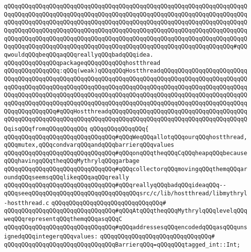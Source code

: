 \verb|qQQqqQQqqQQqqQQqqQQqqQQqqQQqqQQqqQQqqQQqqQQqqQQqqQQqqQQqqQQqqQQqqQQqqQQqqQQqqQQqqQQqqQQqqQQqqQQqqQQqqQQqqQQqqQQqqQQqqQQqqQQqqQQqqQQqqQQqqQQqqQQqqQQqqQQqqQQqqQQqqQQqqQQqqQQqqQQqqQQqqQQqqQQqqQQqqQQqqQQqqQQqqQQqqQQqqQQqqQQqqQQqqQQqqQQqqQQqqQQqqQQqqQQqqQQqqQQqqQQqqQQqqQQqqQQqqQQqqQQqqQQqqQQqqQQqqQQqqQQqqQQqqQQqqQQqqQQqqQQqqQQqqQQqqQQqqQQqqQQqqQQqqQQqqQQqqQQqqQQqqQQqqQQqqQQqqQQqqQQqqQQqqQQqqQQqqQQqqQQqqQQqqQQqqQQqqQQq#qQQqwouldqQQqbeqQQqaqQQqreallyqQQqbadqQQqidea.|\newline
\verb|qQQqqQQqqQQqqQQqpackageqQQqqQQqqQQqhostthread|\newline
\verb|qQQqqQQqqQQqqQQq:qQQq(weak)qQQqqQQqHostthreadqQQqqQQqqQQqqQQqqQQqqQQqqQQqqQQqqQQqqQQqqQQqqQQqqQQqqQQqqQQqqQQqqQQqqQQqqQQqqQQqqQQqqQQqqQQqqQQqqQQqqQQqqQQqqQQqqQQqqQQqqQQqqQQqqQQqqQQqqQQqqQQqqQQqqQQqqQQqqQQqqQQqqQQqqQQqqQQqqQQqqQQqqQQqqQQqqQQqqQQqqQQqqQQqqQQqqQQqqQQqqQQqqQQqqQQqqQQqqQQqqQQqqQQqqQQqqQQqqQQqqQQqqQQqqQQqqQQqqQQqqQQqqQQqqQQqqQQqqQQqqQQqqQQqqQQqqQQqqQQq#qQQqHostthreadqQQqqQQqqQQqqQQqqQQqqQQqqQQqqQQqqQQqqQQqqQQqqQQqqQQqqQQqqQQqqQQqqQQqqQQqqQQqqQQqqQQqqQQqqQQqqQQqqQQqqQQqqQQqqQQqisqQQqfromqQQqqQQqqQQq|\newline
\verb|qQQqqQQqqQQqqQQq{|\newline
\verb|qQQqqQQqqQQqqQQqqQQqqQQqqQQqqQQq#qQQqWeqQQqallotqQQqourqQQqhostthread,qQQqmutex,qQQqcondvarqQQqandqQQqbarrierqQQqvalues|\newline
\verb|qQQqqQQqqQQqqQQqqQQqqQQqqQQqqQQq#qQQqonqQQqtheqQQqCqQQqheapqQQqbecauseqQQqhavingqQQqtheqQQqMythrylqQQqgarbage|\newline
\verb|qQQqqQQqqQQqqQQqqQQqqQQqqQQqqQQq#qQQqcollectorqQQqmovingqQQqthemqQQqaroundqQQqseemsqQQqlikeqQQqaqQQqreally|\newline
\verb|qQQqqQQqqQQqqQQqqQQqqQQqqQQqqQQq#qQQqreallyqQQqbadqQQqideaqQQq--qQQqseeqQQqqQQqqQQqqQQqqQQqqQQqqQQqqQQqsrc/c/lib/hostthread/libmythryl-hostthread.c|\newline
\verb|qQQqqQQqqQQqqQQqqQQqqQQqqQQqqQQq#|\newline
\verb|qQQqqQQqqQQqqQQqqQQqqQQqqQQqqQQq#qQQqAtqQQqtheqQQqMythrylqQQqlevelqQQqweqQQqrepresentqQQqthemqQQqasqQQqC|\newline
\verb|qQQqqQQqqQQqqQQqqQQqqQQqqQQqqQQq#qQQqaddressesqQQqencodedqQQqasqQQqunsignedqQQqintegerqQQqvalues:|\newline
\verb|qQQqqQQqqQQqqQQqqQQqqQQqqQQqqQQq#|\newline
\verb|qQQqqQQqqQQqqQQqqQQqqQQqqQQqqQQqBarrierqQQq=qQQqqQQqtagged_int::Int;|\newline
